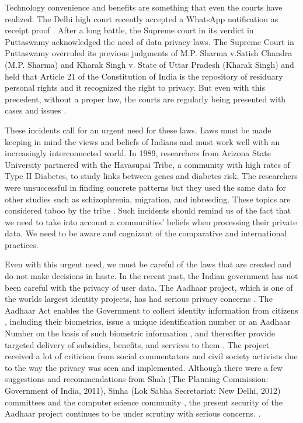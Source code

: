 \par
Technology convenience and benefits are something that even the courts have realized. The Delhi high court recently accepted a WhatsApp notification as receipt proof \cite{whatdoublereceipt}. After a long battle, the Supreme court in its verdict in Puttaswamy acknowledged the need of data privacy laws. The Supreme Court in Puttaswamy \cite{puttaswam} overruled its previous judgments of M.P. Sharma v.Satish Chandra (M.P. Sharma) \cite{mpsharma} and Kharak Singh v. State of Uttar Pradesh (Kharak Singh) \cite{kharak} and held that Article 21 of the Constitution of India is the repository of residuary personal rights and it recognized the right to privacy. But even with this precedent, without a proper law, the courts are regularly being presented with cases and issues \cite{whatuserthird}.
\par
{} \label{havasupai}
These incidents call for an urgent need for these laws. Laws must be made keeping in mind the views and beliefs of Indians and must work well with an increasingly interconnected world. In 1989, researchers from Arizona State University partnered with the Havasupai Tribe, a community with high rates of Type II Diabetes, to study links between genes and diabetes risk. The researchers were unsuccessful in finding concrete patterns but they used the same data for other studies such as schizophrenia, migration, and inbreeding. These topics are considered taboo by the tribe \cite{havasupai1, havasupai2}. Such incidents should remind us of the fact that we need to take into account a communities' beliefs when processing their private data. We need to be aware and cognizant of the comparative and international practices.
\par
Even with this urgent need, we must be careful of the laws that are created and do not make decisions in haste. In the recent past, the Indian government has not been careful with the privacy of user data. The Aadhaar project, which is one of the worlds largest identity projects, has had serious privacy concerns \cite{aadharlok}. The Aadhaar Act enables the Government to collect identity information from citizens \cite{aadhar30}, including their biometrics, issue a unique identification number or an Aadhaar Number on the basis of such biometric information \cite{aadhar3}, and thereafter provide targeted delivery of subsidies, benefits, and services to them \cite{aadhar7}. The project received a lot of criticism from social commentators and civil society activists \cite{aadharbhanu,aadhararun,aadharjean} due to the way the privacy was seen and implemented. Although there were a few suggestions \cite{aadharlist} and recommendations from Shah (The Planning Commission: Government of India, 2011), Sinha (Lok Sabha Secretariat: New Delhi, 2012) committees \cite{aadharshah} and the computer science community \cite{aadharshw}, the present security of the Aadhaar project continues to be under scrutiny with serious concerns. \cite{aadharnew}.
